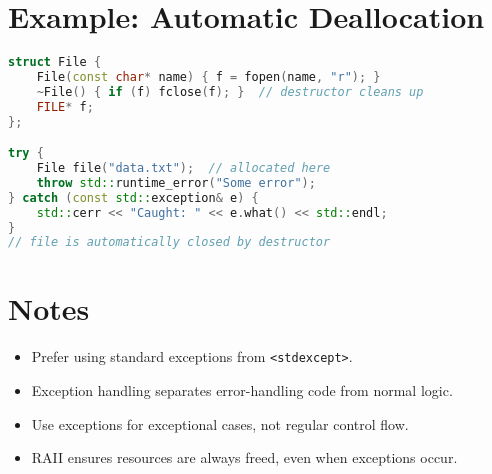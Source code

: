\documentclass{article}
\begin{document}
\section{Example: Automatic Deallocation}
\begin{lstlisting}[language=C++]
struct File {
    File(const char* name) { f = fopen(name, "r"); }
    ~File() { if (f) fclose(f); }  // destructor cleans up
    FILE* f;
};

try {
    File file("data.txt");  // allocated here
    throw std::runtime_error("Some error");
} catch (const std::exception& e) {
    std::cerr << "Caught: " << e.what() << std::endl;
}
// file is automatically closed by destructor
\end{lstlisting}

\section{Notes}
\begin{itemize}
    \item Prefer using standard exceptions from \texttt{<stdexcept>}.
    \item Exception handling separates error-handling code from normal logic.
    \item Use exceptions for exceptional cases, not regular control flow.
    \item RAII ensures resources are always freed, even when exceptions occur.
\end{itemize}
\end{document}
